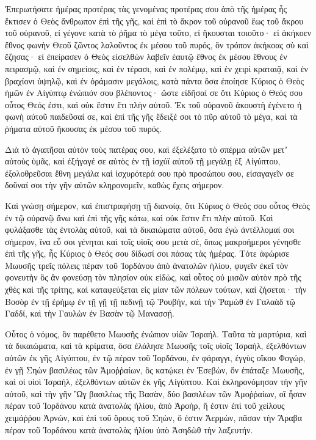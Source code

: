 {\par }{\PP {}Ἐπερωτήσατε ἡμέρας προτέρας τὰς γενομένας προτέρας σου ἀπὸ τῆς ἡμέρας ἧς ἔκτισεν ὁ Θεὸς ἄνθρωπον ἐπὶ τῆς γῆς, καὶ ἐπὶ τὸ ἄκρον τοῦ οὐρανοῦ ἕως τοῦ ἄκρου τοῦ οὐρανοῦ, εἰ γέγονε κατὰ τὸ ῥῆμα τὸ μέγα τοῦτο, εἰ ἤκουσται τοιοῦτο· εἰ ἀκήκοεν ἔθνος φωνὴν
Θεοῦ ζῶντος λαλοῦντος ἐκ μέσου τοῦ πυρός, ὃν τρόπον ἀκήκοας σὺ καὶ ἔζησας·
εἰ ἐπείρασεν ὁ Θεὸς εἰσελθὼν λαβεῖν ἑαυτῷ ἔθνος ἐκ μέσου ἔθνους ἐν πειρασμῷ, καὶ ἐν σημείοις, καὶ ἐν τέρασι, καὶ ἐν πολέμῳ, καὶ ἐν χειρὶ κραταιᾷ, καὶ ἐν βραχίονι ὑψηλῷ, καὶ ἐν ὁράμασιν μεγάλοις, κατὰ πάντα ὅσα ἐποίησε Κύριος ὁ Θεὸς ἡμῶν ἐν Αἰγύπτῳ ἐνώπιόν σου βλέποντος·
ὥστε εἰδῆσαί σε ὅτι Κύριος ὁ Θεός σου οὗτος Θεός ἐστι, καὶ οὐκ ἔστιν ἔτι πλὴν αὐτοῦ.
Ἐκ τοῦ οὐρανοῦ ἀκουστὴ ἐγένετο ἡ φωνὴ αὐτοῦ παιδεῦσαί σε, καὶ ἐπὶ τῆς γῆς ἔδειξέ σοι τὸ πῦρ αὐτοῦ τὸ μέγα, καὶ τὰ ῥήματα αὐτοῦ ἤκουσας ἐκ μέσου τοῦ πυρός.
\par }{\PP {}Διὰ τὸ ἀγαπῆσαι αὐτὸν τοὺς πατέρας σου, καὶ ἐξελέξατο τὸ σπέρμα αὐτῶν μετʼ αὐτοὺς ὑμᾶς, καὶ ἐξήγαγέ σε αὐτὸς ἐν τῇ ἰσχύϊ αὐτοῦ τῇ μεγάλῃ ἐξ Αἰγύπτου,
ἐξολοθρεῦσαι ἔθνη μεγάλα καὶ ἰσχυρότερά σου πρὸ προσώπου σου, εἰσαγαγεῖν σε δοῦναί σοι τὴν γῆν αὐτῶν κληρονομεῖν, καθὼς ἔχεις σήμερον.
\par }{\PP {}Καὶ γνώσῃ σήμερον, καὶ ἐπιστραφήσῃ τῇ διανοίᾳ, ὅτι Κύριος ὁ Θεός σου οὗτος Θεὸς ἐν τῷ οὐρανῷ ἄνω καὶ ἐπὶ τῆς γῆς κάτω, καὶ οὐκ ἔστιν ἔτι πλὴν αὐτοῦ.
Καὶ φυλάξασθε τὰς ἐντολὰς αὐτοῦ, καὶ τὰ δικαιώματα αὐτοῦ, ὅσα ἐγὼ ἀντέλλομαί σοι σήμερον, ἵνα εὖ σοι γένηται καὶ τοῖς υἱοῖς σου μετὰ σὲ, ὅπως μακροήμεροι γένησθε ἐπὶ τῆς γῆς, ἧς Κύριος ὁ Θεός σου δίδωσί σοι πάσας τὰς ἡμέρας.
Τότε ἀφώρισε Μωυσῆς τρεῖς πόλεις πέραν τοῦ Ἰορδάνου ἀπὸ ἀνατολῶν ἡλίου,
φυγεῖν ἐκεῖ τὸν φονευτὴν ὃς ἂν φονεύσῃ τὸν πλησίον οὐκ εἰδὼς, καὶ οὗτος οὐ μισῶν αὐτὸν πρὸ τῆς χθὲς καὶ τῆς τρίτης, καὶ καταφεύξεται εἰς μίαν τῶν πόλεων τούτων, καὶ ζήσεται·
τὴν Βοσὸρ ἐν τῇ ἐρήμῳ ἐν τῇ γῇ τῇ πεδινῇ τῷ Ῥουβήν, καὶ τὴν Ῥαμὼθ ἐν Γαλαὰδ τῷ Γαδδί, καὶ τὴν Γαυλὼν ἐν Βασὰν τῷ Μανασσῄ.
\par }{\PP {}Οὗτος ὁ νόμος, ὃν παρέθετο Μωυσῆς ἐνώπιον υἱῶν Ἰσραήλ.
Ταῦτα τὰ μαρτύρια, καὶ τὰ δικαιώματα, καὶ τὰ κρίματα, ὅσα ἐλάλησε Μωυσῆς τοῖς υἱοῖς Ἰσραήλ, ἐξελθόντων αὐτῶν ἐκ γῆς Αἰγύπτου,
ἐν τῷ πέραν τοῦ Ἰορδάνου, ἐν φάραγγι, ἐγγὺς οἴκου Φογώρ, ἐν γῇ Σηὼν βασιλέως τῶν Ἀμοῤῥαίων, ὃς κατῴκει ἐν Ἐσεβὼν, ὅν ἐπάταξε Μωυσῆς, καὶ οἱ υἱοὶ Ἰσραήλ, ἐξελθόντων αὐτῶν ἐκ γῆς Αἰγύπτου.
Καὶ ἐκληρονόμησαν τὴν γῆν αὐτοῦ, καὶ τὴν γῆν Ὢγ βασιλέως τῆς Βασὰν, δύο βασιλέων τῶν Ἀμοῤῥαίων, οἳ ἦσαν πέραν τοῦ Ἰορδάνου κατὰ ἀνατολὰς ἡλίου,
ἀπὸ Ἀροὴρ, ἥ ἐστιν ἐπὶ τοῦ χείλους χειμάῤῥου Ἀρνών, καὶ ἐπὶ τοῦ ὄρους τοῦ Σηὼν, ὅ ἐστιν Ἀερμὼν,
πᾶσαν τὴν Ἄραβα πέραν τοῦ Ἰορδάνου κατὰ ἀνατολὰς ἡλίου ὑπὸ Ἀσηδὼθ τὴν λαξευτήν.

}
